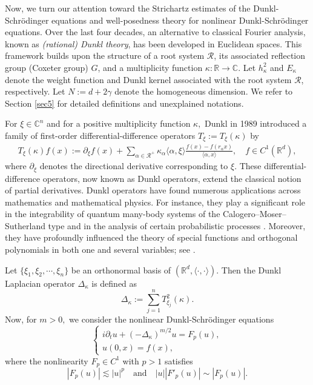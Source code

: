 \documentclass[a4paper,11pt, reqno]{amsart}
\theoremstyle{definition}
\theoremstyle{remark}
\numberwithin{equation}{section}
\newcommand{\K}{\kappa }
\begin{document}
    	Now, we turn our attention toward the Strichartz estimates of the Dunkl-Schr\"odinger equations and well-posedness theory for nonlinear Dunkl-Schr\"odinger equations. Over the last four decades, an alternative to classical Fourier analysis, known as \textit{(rational) Dunkl theory}, has been developed in Euclidean spaces. This framework builds upon the structure of a root system $\mathcal{R}$, its associated reflection group (Coxeter group) \( G \), and a multiplicity function \( \K: \mathbb{R} \rightarrow \mathbb{C} \).
 Let $h^2_\K$ and $E_\K$ denote the weight function and Dunkl kernel associated with the root system $\mathcal{R}$, respectively.  Let $N:=d+2\gamma$ denote the homogeneous dimension.  We refer to Section \ref{sec5} for detailed definitions and unexplained notations.

 For $\xi \in \mathbb{C}^{n}$ and for a positive multiplicity function $\kappa,$ Dunkl \cite{dun1991} in 1989 introduced a family of first-order differential-difference operators $T_{\xi}:= T_{\xi}(\kappa)$  by
	\begin{align}\label{dunklinro}
		T_{\xi}(\kappa) f(x):=\partial_{\xi} f(x)+\sum_{\alpha \in \mathcal{R}^{+}} \kappa_{\alpha }\langle \alpha, \xi\rangle \frac{f(x)-f\left(r_{\alpha} x\right)}{\langle \alpha, x\rangle}, \quad f \in C^{1}(\mathbb{R}^{d}),
	\end{align}
	where $\partial_{\xi}$ denotes the directional derivative corresponding to $\xi$. These differential-difference operators, now known as Dunkl operators, extend the classical notion of partial derivatives.  Dunkl operators have found numerous applications across mathematics and mathematical physics. For instance, they play a significant role in the integrability of quantum many-body systems of the Calogero–Moser–Sutherland type and in the analysis of certain probabilistic processes \cite{Van, Hakimi}. Moreover, they have profoundly influenced the theory of special functions and orthogonal polynomials in both one and several variables; see \cite{Dunkl book}.

Let $\{\xi_1, \xi_2, \cdots, \xi_n\}$ be an orthonormal basis of $(\mathbb{R}^{d} , \langle \cdot, \cdot\rangle )$. Then  the Dunkl Laplacian operator $\Delta_\kappa $ is defined as $$\Delta_\kappa:=\sum_{j=1}^nT^2_{\xi_j}(\kappa).$$
  Now, for $m >0 ,$ we consider the   nonlinear Dunkl-Schr\"odinger   equations
	\begin{equation}\label{DNLS1}
		\begin{cases}
			i\partial_t u + (-\Delta_\kappa)^{m/2} u= F_p(u), \\
			u(0, x)=f(x),
		\end{cases}
	\end{equation}
	where the nonlinearity $F_p \in C^1$ with $p>1$ satisfies
	\begin{equation}\label{as1}
		|F_p(u)|\lesssim |u|^p \quad \text{and} \quad |u||F'_p(u)|\sim |F_p(u)|. 
	\end{equation}
     
\end{document}

